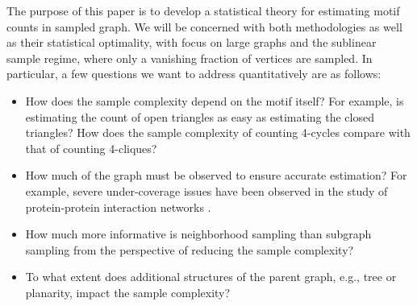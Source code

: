 








The purpose of this paper is to develop a statistical theory for estimating motif counts in sampled graph. We will be concerned with both methodologies as well as their statistical optimality, with focus on large graphs and the sublinear sample regime, where only a vanishing fraction of vertices are sampled.
In particular, a few questions we want to address quantitatively are as follows:
\begin{itemize}
	\item How does the sample complexity depend on the motif itself? For example, 
	is estimating the count of open triangles as easy as estimating the closed triangles?
	How does the sample complexity of counting 4-cycles compare with that of counting 4-cliques?
	\item How much of the graph must be observed to ensure accurate estimation? For example, severe under-coverage issues have been observed in the study of protein-protein interaction networks \cite{Han2005}.
\item How much more informative is neighborhood sampling than subgraph sampling from the perspective of reducing the sample complexity?
\item To what extent does additional structures of the parent graph, e.g., tree or planarity, impact the sample complexity?
\end{itemize}

